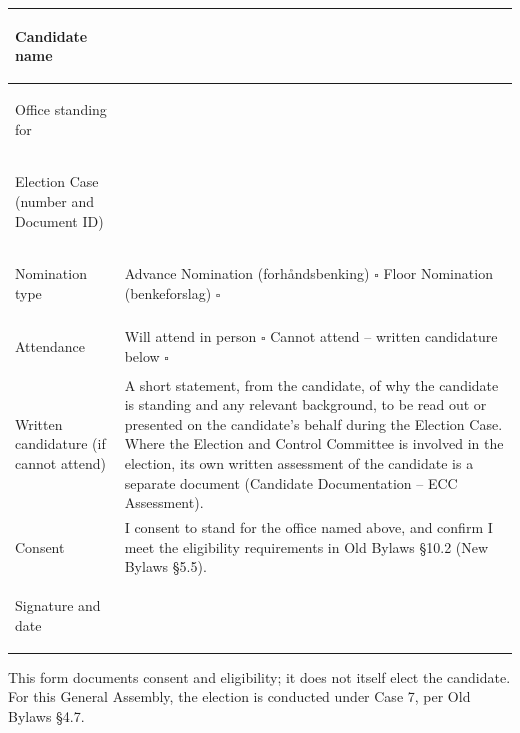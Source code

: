 \documentclass{../../../Common/Latex/Templates/rapport}
\begin{document}
\vspace{0.4cm}
\begin{tabularx}{\textwidth}{|>{\bfseries\raggedright\arraybackslash}p{4.2cm}|X|}
  \hline
  Candidate name                         & \rule{0pt}{1.2cm}                                                                                                                                                                \\
  \hline
  Office standing for                    & \rule{0pt}{1.2cm}                                                                                                                                                                \\
  \hline
  Election Case (number and Document ID) & \rule{0pt}{1.2cm}                                                                                                                                                                \\
  \hline
  Nomination type                        & \rule{0pt}{1.2cm}Advance Nomination (forhåndsbenking) \quad $\square$ \quad Floor Nomination (benkeforslag) \quad $\square$                                                      \\
  \hline
  Attendance                             & \rule{0pt}{1.2cm}Will attend in person \quad $\square$ \quad Cannot attend -- written candidature below \quad $\square$                                                          \\
  \hline
  Written candidature (if cannot attend) & \rule{0pt}{3.2cm}A short statement, from the candidate, of why the candidate is standing and any relevant background, to be read out or presented on the candidate's behalf during the Election Case. Where the Election and Control Committee is involved in the election, its own written assessment of the candidate is a separate document (Candidate Documentation -- ECC Assessment). \\
  \hline
  Consent                                & \rule{0pt}{1.6cm}I consent to stand for the office named above, and confirm I meet the eligibility requirements in Old Bylaws \S10.2 (New Bylaws \S5.5).                         \\
  \hline
  Signature and date                     & \rule{0pt}{1.4cm}                                                                                                                                                                \\
  \hline
\end{tabularx}

\vfill
This form documents consent and eligibility; it does not itself elect the candidate. For this General Assembly, the election is conducted under Case 7, per Old Bylaws \S4.7.
\end{document}
